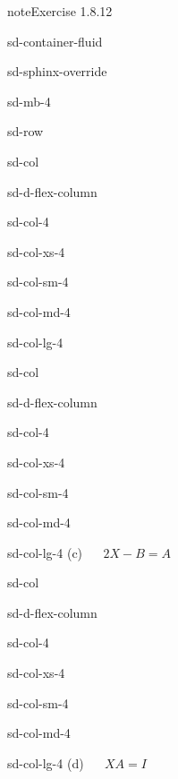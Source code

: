 \documentclass[letterpaper,10pt,english]{jupyterBook}
\begin{document}
\begin{sphinxadmonition}{note}{Exercise 1.8.12}
\begin{sphinxuseclass}{sd-container-fluid}
\begin{sphinxuseclass}{sd-sphinx-override}
\begin{sphinxuseclass}{sd-mb-4}
\begin{sphinxuseclass}{sd-row}
\begin{sphinxuseclass}{sd-col}
\begin{sphinxuseclass}{sd-d-flex-column}
\begin{sphinxuseclass}{sd-col-4}
\begin{sphinxuseclass}{sd-col-xs-4}
\begin{sphinxuseclass}{sd-col-sm-4}
\begin{sphinxuseclass}{sd-col-md-4}
\begin{sphinxuseclass}{sd-col-lg-4}
\end{sphinxuseclass}
\end{sphinxuseclass}
\end{sphinxuseclass}
\end{sphinxuseclass}
\end{sphinxuseclass}
\end{sphinxuseclass}
\end{sphinxuseclass}
\begin{sphinxuseclass}{sd-col}
\begin{sphinxuseclass}{sd-d-flex-column}
\begin{sphinxuseclass}{sd-col-4}
\begin{sphinxuseclass}{sd-col-xs-4}
\begin{sphinxuseclass}{sd-col-sm-4}
\begin{sphinxuseclass}{sd-col-md-4}
\begin{sphinxuseclass}{sd-col-lg-4}
\sphinxAtStartPar
(c)   \(2X - B = A\)

\end{sphinxuseclass}
\end{sphinxuseclass}
\end{sphinxuseclass}
\end{sphinxuseclass}
\end{sphinxuseclass}
\end{sphinxuseclass}
\end{sphinxuseclass}
\begin{sphinxuseclass}{sd-col}
\begin{sphinxuseclass}{sd-d-flex-column}
\begin{sphinxuseclass}{sd-col-4}
\begin{sphinxuseclass}{sd-col-xs-4}
\begin{sphinxuseclass}{sd-col-sm-4}
\begin{sphinxuseclass}{sd-col-md-4}
\begin{sphinxuseclass}{sd-col-lg-4}
\sphinxAtStartPar
(d)   \(XA = I\)


\end{sphinxuseclass}
\end{sphinxuseclass}
\end{sphinxuseclass}
\end{sphinxuseclass}
\end{sphinxuseclass}
\end{sphinxuseclass}
\end{sphinxuseclass}
\end{sphinxuseclass}
\end{sphinxuseclass}
\end{sphinxuseclass}
\end{sphinxuseclass}
\end{sphinxadmonition}
\end{document}
